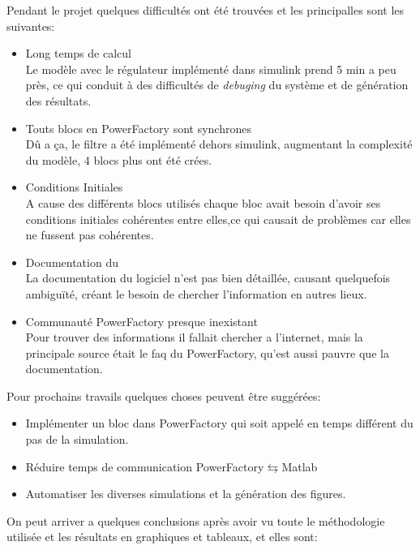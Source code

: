 
\newpage
{}
Pendant le projet quelques difficultés ont été trouvées et les principalles sont les suivantes:

\begin{itemize}
	\item Long temps de calcul\\
	Le modèle avec le régulateur implémenté dans simulink prend 5 min a peu près, ce qui conduit à des difficultés de \textit{debuging} du système et de génération des résultats.\\ 
	\item Touts blocs en PowerFactory sont synchrones\\
	Dû a ça, le filtre a été implémenté dehors simulink, augmentant la complexité du modèle, 4 blocs plus ont été crées.\\
	\item Conditions Initiales\\ 
	A cause des différents blocs utilisés chaque bloc avait besoin d'avoir ses conditions initiales cohérentes entre elles,ce qui causait de problèmes car elles ne fussent pas cohérentes.\\
	\item Documentation du \powerfactory\\
	La documentation du logiciel n'est pas bien détaillée, causant quelquefois ambiguïté, créant le besoin de chercher l'information en autres lieux.\\
	\item Communauté PowerFactory presque inexistant\\
	Pour trouver des informations il fallait chercher a l'internet, mais la principale source était le faq du PowerFactory, qu'est aussi pauvre que la documentation. 
\end{itemize}

Pour prochains travails quelques choses peuvent être suggérées:
\begin{itemize}
	\item Implémenter un bloc dans PowerFactory qui soit appelé en temps différent du pas de la simulation.
	\item Réduire temps de communication PowerFactory$ \leftrightarrows $Matlab
	\item Automatiser les diverses simulations et la génération des figures.
\end{itemize}
\newpage
{}
On peut arriver a quelques conclusions après avoir vu toute le méthodologie utilisée et les résultats en graphiques et tableaux, et elles sont:

